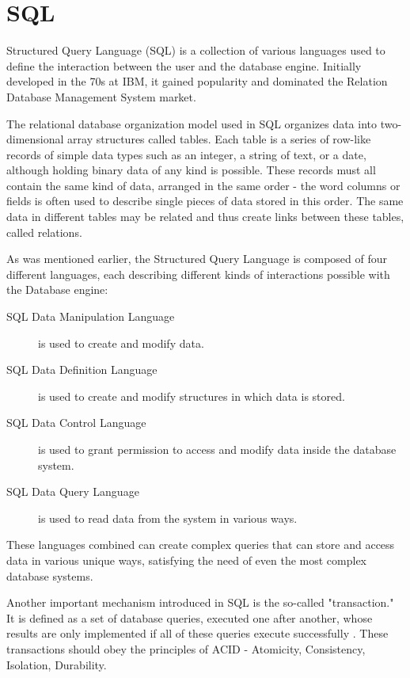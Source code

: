 \section{SQL}
\label{sec:background:first_section}
\par Structured Query Language (SQL) is a collection of various languages used to define the interaction between the user and the database engine. Initially developed in the 70s at IBM, it gained popularity and dominated the Relation Database Management System market\citep{SQLHandbook}.
\par The relational database organization model used in SQL organizes data into two-dimensional array structures called tables. Each table is a series of row-like records of simple data types such as an integer, a string of text, or a date, although holding binary data of any kind is possible. These records must all contain the same kind of data, arranged in the same order - the word columns or fields is often used to describe single pieces of data stored in this order. The same data in different tables may be related and thus create links between these tables, called relations.
\par As was mentioned earlier, the Structured Query Language is composed of four different languages, each describing different kinds of interactions possible with the Database engine\citep{KreibchSQLite}:
\begin{description}
  \item[SQL Data Manipulation Language] is used to create and modify data.
  \item[SQL Data Definition Language] is used to create and modify structures in which data is stored.
  \item[SQL Data Control Language] is used to grant permission to access and modify data inside the database system.
  \item[SQL Data Query Language] is used to read data from the system in various ways.
\end{description}
\par These languages combined can create complex queries that can store and access data in various unique ways, satisfying the need of even the most complex database systems.
\par Another important mechanism introduced in SQL is the so-called "transaction." It is defined as a set of database queries, executed one after another, whose results are only implemented if all of these queries execute successfully \citep{SQLHandbook}. These transactions should obey the principles of ACID - Atomicity, Consistency, Isolation, Durability\citep{ACID}.
